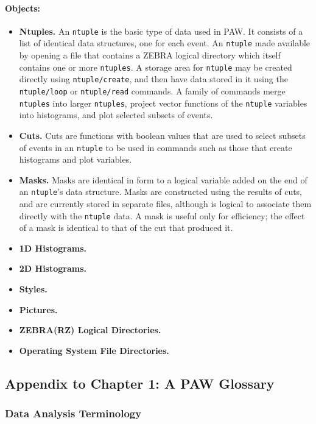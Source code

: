 \paragraph{Objects:}
\begin{itemize}
\item {\bf Ntuples.}  An \verb|ntuple| is the basic type
of data used in PAW.  It consists of a list of identical
data structures, one for each event. An \verb|ntuple|
made available by opening a file that contains a ZEBRA logical
directory which itself contains one or more \verb|ntuples|.
A storage area for \verb|ntuple| may  be created directly
using \verb|ntuple/create|, and then have data stored in
it using the \verb|ntuple/loop| or \verb|ntuple/read| commands.
A family of commands merge \verb|ntuples| into larger \verb|ntuples|,
project vector functions of the \verb|ntuple| variables into
histograms, and plot selected subsets of events.
\item {\bf Cuts.}  Cuts are functions with boolean values
that are used to select subsets of events in an \verb|ntuple|
to be used in  commands such as those that create histograms
and plot variables.
\item {\bf Masks.}  Masks are identical in form to a logical
variable added on the end of an \verb|ntuple|'s data structure.
Masks are constructed using the results of cuts, and are currently
stored in separate files, although is logical to
associate them directly with the \verb|ntuple| data.  A mask
is useful only for efficiency;  the effect of a mask is identical
to that of the cut that produced it.
\item {\bf 1D Histograms.}
\item {\bf 2D Histograms.}
\item {\bf Styles.}
\item {\bf Pictures.}
\item {\bf ZEBRA(RZ) Logical Directories.}
\item {\bf Operating System File Directories.}
\end{itemize}
 
\subsection*{Appendix to Chapter 1: A PAW Glossary}

\subsubsection*{Data Analysis Terminology}


